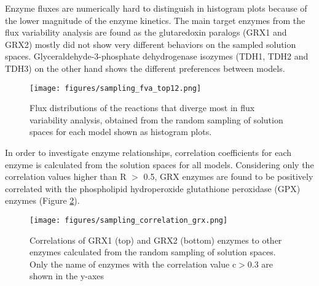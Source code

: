 \vspace{-1cm}

Enzyme fluxes are numerically hard to distinguish in histogram plots because of the lower magnitude of the enzyme kinetics. The main target enzymes from the flux variability analysis are found as the glutaredoxin paralogs (GRX1 and GRX2) mostly did not show very different behaviors on the sampled solution spaces. Glyceraldehyde-3-phosphate dehydrogenase isozymes (TDH1, TDH2 and TDH3) on the other hand shows the different preferences between models.

\begin{figure}[H]
  \begin{center}
  \texttt{[image: figures/sampling\_fva\_top12.png]}
  \caption[Flux distributions of the reactions that diverge  most in flux variability analysis, obtained from the random sampling of solution spaces for each model shown as histogram plots]{Flux distributions of the reactions that diverge most in flux variability analysis, obtained from the random sampling of solution spaces for each model shown as histogram plots.}
  \label{fig:sampling_fva_top12}
  \end{center}
\end{figure}

\vspace{-1cm}



In order to investigate enzyme relationships, correlation coefficients for each enzyme is calculated from the solution spaces for all models. Considering only the correlation values higher than R $>$ 0.5, GRX enzymes are found to be positively correlated with the phospholipid hydroperoxide glutathione peroxidase (GPX) enzymes (Figure \ref{fig:sampling_correlation_grx}).

\begin{figure}[H]
  \begin{center}
  \texttt{[image: figures/sampling\_correlation\_grx.png]}
  \caption[Correlations of GRX1 (top) and GRX2 (bottom) enzymes to other enzymes calculated from the random sampling of solution spaces. Only the name of enzymes with the correlation value c$>$0.8 are shown in the y-axes]{Correlations of GRX1 (top) and GRX2 (bottom) enzymes to other enzymes calculated from the random sampling of solution spaces. Only the name of enzymes with the correlation value c$>$0.3 are shown in the y-axes}
  \label{fig:sampling_correlation_grx}
  \end{center}
\end{figure}

